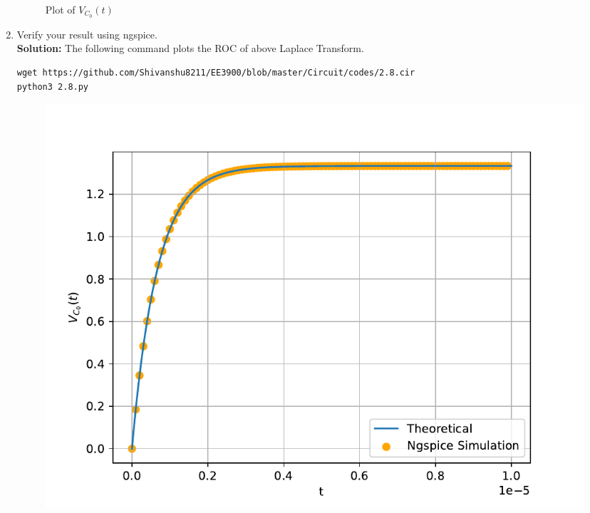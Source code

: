\documentclass[journal,12pt,twocolumn]{IEEEtran}
\newcommand{\solution}{\noindent \textbf{Solution: }}
\numberwithin{equation}{section}
\renewcommand\thesection{\arabic{section}}
\begin{document}
\begin{enumerate}[label=\arabic*.,ref=\thesection.\theenumi]
\begin{figure}[!ht]
			\caption{Plot of $V_{C_0}(t)$}
\end{figure}
	\item Verify your result using ngspice.\\
	\solution The following command plots the ROC of above Laplace Transform.
	\begin{lstlisting}
wget https://github.com/Shivanshu8211/EE3900/blob/master/Circuit/codes/2.8.cir	
python3 2.8.py
\end{lstlisting}
\begin{figure}[!ht]
			\centering
			\includegraphics[width=\columnwidth]{figs/2.8.1}
			\caption{}
			\label{fig:ckt1}
\end{figure}
\end{enumerate}
\end{document}
